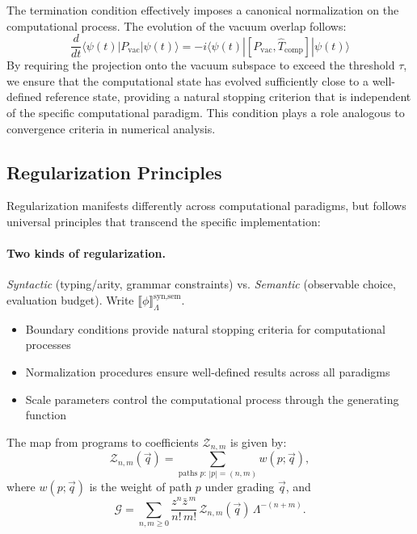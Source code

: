 The termination condition effectively imposes a canonical normalization on the computational process. The evolution of the vacuum overlap follows:
\[
\frac{d}{dt}\langle \psi(t)|P_{\mathrm{vac}}|\psi(t)\rangle = -i\langle \psi(t)|[P_{\mathrm{vac}}, \hat{T}_{\mathrm{comp}}]|\psi(t)\rangle
\]
By requiring the projection onto the vacuum subspace to exceed the threshold $\tau$, we ensure that the computational state has evolved sufficiently close to a well-defined reference state, providing a natural stopping criterion that is independent of the specific computational paradigm. This condition plays a role analogous to convergence criteria in numerical analysis.

\subsection{Regularization Principles}

Regularization manifests differently across computational paradigms, but follows universal principles that transcend the specific implementation:

\paragraph{Two kinds of regularization.}
\textit{Syntactic} (typing/arity, grammar constraints) vs. \textit{Semantic} (observable choice, evaluation budget). Write $\llbracket\phi\rrbracket_{\Lambda}^{\text{syn},\text{sem}}$.

\begin{itemize}
\item Boundary conditions provide natural stopping criteria for computational processes
\item Normalization procedures ensure well-defined results across all paradigms
\item Scale parameters control the computational process through the generating function
\end{itemize}

\begin{definition}
\label{def:program-coefficient-map}
The map from programs to coefficients $\mathcal{Z}_{n,m}$ is given by:
\[
\mathcal{Z}_{n,m}(\vec{q}) = \sum_{\text{paths }p:\,|p|=(n,m)} w(p;\vec{q}),
\]
where $w(p;\vec{q})$ is the weight of path $p$ under grading $\vec{q}$, and
\[
\mathcal{G} = \sum_{n,m\ge0}\frac{z^n\bar{z}^{\,m}}{n!\,m!}\,\mathcal{Z}_{n,m}(\vec{q})\,\Lambda^{-(n+m)}.
\]
\end{definition}

